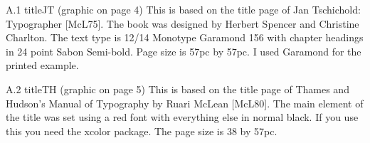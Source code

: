A.1 titleJT (graphic on page 4)
This is based on the title page of Jan Tschichold: Typographer [McL75]. The book was
designed by Herbert Spencer and Christine Charlton. The text type is 12/14 Monotype
Garamond 156 with chapter headings in 24 point Sabon Semi-bold. Page size is 57pc
by 57pc.
I used Garamond for the printed example.
\newcommand*{\titleJT}{\begingroup%
\FSfont{5gm} %
\drop = 0.08\textheight
\vspace*{\drop}
\hspace*{0.3\textwidth}
{\Large The Author}\\[2\drop]
\hspace*{0.3\textwidth}{\Huge\itshape The Big Book of}\par
{\raggedleft\Huge\itshape Conundrums\par}
\vfill
\hspace*{0.3\textwidth}{\Large \plogo}\\[0.5\baselineskip]
\hspace*{0.3\textwidth}{\Large The Publisher}
\vspace*{\drop}
\endgroup}



A.2 titleTH (graphic on page 5)
This is based on the title page of Thames and Hudson’s Manual of Typography by
Ruari McLean [McL80]. The main element of the title was set using a red font with
everything else in normal black. If you use this you need the xcolor package. The
page size is 38 by 57pc.
\newcommand*{\titleTH}{\begingroup%
\raggedleft
\vspace*{\baselineskip}
{\Large The Author}\\[0.167\textheight]
{\bfseries The Big Book of}\\[\baselineskip]
{\textcolor{Red}{\Huge CONUNDRUMS}}\\[\baselineskip]
{\small With 123 illustrations}\par
\vfill
{\Large The Publisher \plogo}\par
\vspace*{3\baselineskip}
\endgroup}

